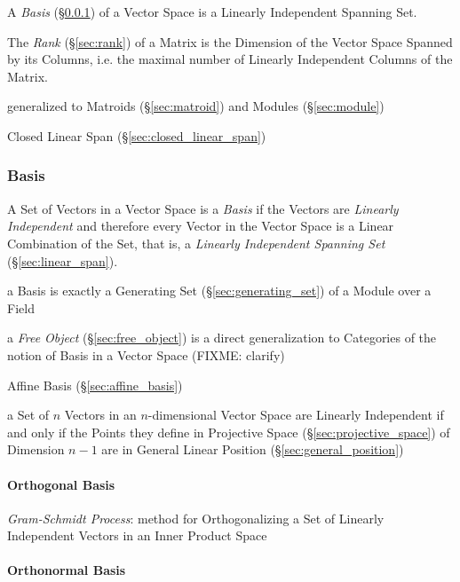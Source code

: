 A \emph{Basis} (\S\ref{sec:basis}) of a Vector Space is a Linearly Independent
Spanning Set.

The \emph{Rank} (\S\ref{sec:rank}) of a Matrix is the Dimension of the Vector
Space Spanned by its Columns, i.e. the maximal number of Linearly Independent
Columns of the Matrix.

generalized to Matroids (\S\ref{sec:matroid}) and Modules (\S\ref{sec:module})

Closed Linear Span (\S\ref{sec:closed_linear_span})



\subsubsection{Basis}\label{sec:basis}

A Set of Vectors in a Vector Space is a \emph{Basis} if the Vectors are
\emph{Linearly Independent} and therefore every Vector in the Vector Space is a
Linear Combination of the Set, that is, a \emph{Linearly Independent Spanning
  Set} (\S\ref{sec:linear_span}).

a Basis is exactly a Generating Set (\S\ref{sec:generating_set}) of a Module
over a Field

\fist a \emph{Free Object} (\S\ref{sec:free_object}) is a direct generalization
to Categories of the notion of Basis in a Vector Space
(FIXME: clarify)

\fist Affine Basis (\S\ref{sec:affine_basis})

a Set of $n$ Vectors in an $n$-dimensional Vector Space are Linearly
Independent if and only if the Points they define in Projective Space
(\S\ref{sec:projective_space}) of Dimension $n-1$ are in General Linear
Position (\S\ref{sec:general_position})



\paragraph{Orthogonal Basis}\label{sec:orthogonal_basis}\hfill

\emph{Gram-Schmidt Process}: method for Orthogonalizing a Set of Linearly
Independent Vectors in an Inner Product Space



\paragraph{Orthonormal Basis}\label{sec:orthonormal_basis}\hfill


